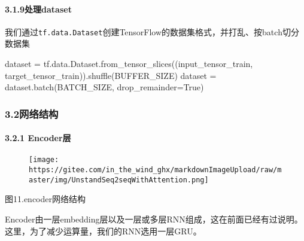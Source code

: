 \documentclass[
]{article}
\newenvironment{Shaded}{}{}
\newcommand{\NormalTok}[1]{#1}
\newcommand{\OperatorTok}[1]{\textcolor[rgb]{0.40,0.40,0.40}{#1}}
\newcommand{\VariableTok}[1]{\textcolor[rgb]{0.10,0.09,0.49}{#1}}
\begin{document}
\hypertarget{header-n116}{%
\paragraph{3.1.9处理dataset}\label{header-n116}}

我们通过\texttt{tf.data.Dataset}创建TensorFlow的数据集格式，并打乱、按batch切分数据集

\begin{Shaded}
\begin{Highlighting}[]
\NormalTok{dataset }\OperatorTok{=}\NormalTok{ tf.data.Dataset.from\_tensor\_slices((input\_tensor\_train, target\_tensor\_train)).shuffle(BUFFER\_SIZE)}
\NormalTok{dataset }\OperatorTok{=}\NormalTok{ dataset.batch(BATCH\_SIZE, drop\_remainder}\OperatorTok{=}\VariableTok{True}\NormalTok{)}
\end{Highlighting}
\end{Shaded}

\hypertarget{header-n119}{%
\subsubsection{3.2网络结构}\label{header-n119}}

\hypertarget{header-n120}{%
\paragraph{3.2.1 Encoder层}\label{header-n120}}

\begin{figure}
\centering
\texttt{[image: https://gitee.com/in\_the\_wind\_ghx/markdownImageUpload/raw/master/img/UnstandSeq2seqWithAttention.png]}
\caption{}
\end{figure}

图11.encoder网络结构

Encoder由一层embedding层以及一层或多层RNN组成，这在前面已经有过说明。这里，为了减少运算量，我们的RNN选用一层GRU。
\end{document}
